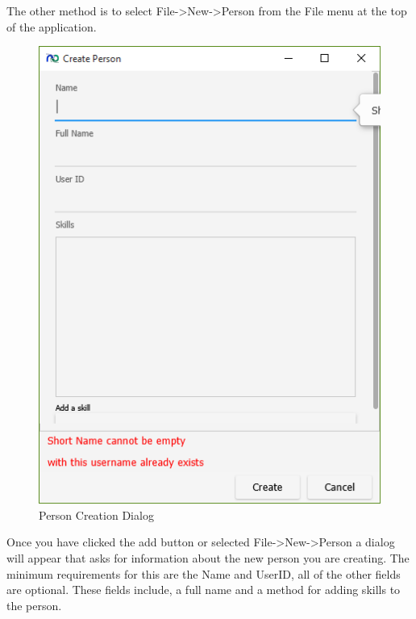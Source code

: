 The other method is to select File-\textgreater New-\textgreater Person from the File menu at the top of the application.

\begin{figure}[H]
	\centering
	\includegraphics[width=\textwidth]{images/screenshots/people2.PNG}
	\caption{Person Creation Dialog}
	\label{fig:new_project}
\end{figure}

Once you have clicked the add button or selected File-\textgreater New-\textgreater Person a dialog will appear that asks for information about the new person you are creating. The minimum requirements for this are the Name and UserID, all of the other fields are optional. These fields include, a full name and a method for adding skills to the person.

